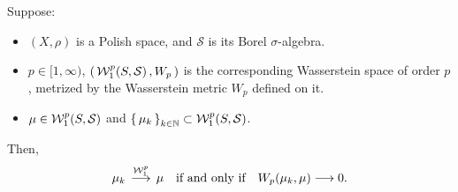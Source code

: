 \begin{theorem}
\noindent
Suppose:
\begin{itemize}
\item $(X, \rho)$ is a Polish space, and $\mathcal{S}$ is its Borel $\sigma$-algebra.
\item $p \in [1,\infty)$,
	$\left(\,\mathcal{W}^{p}_{1}\!\left(S,\mathcal{S}\right),W_{p}\,\right)$ is the corresponding Wasserstein space of order $p$,
	metrized by the Wasserstein metric $W_{p}$ defined on it.
\item $\mu \in \mathcal{W}^{p}_{1}\!\left(S,\mathcal{S}\right)$ and
	$\left\{\,\mu_{k}\,\right\}_{k\in\mathbb{N}} \subset \mathcal{W}^{p}_{1}\!\left(S,\mathcal{S}\right)$.
\end{itemize}
Then,
\begin{equation*}
\mu_{k} \, \overset{\mathcal{W}^{p}_{1}}{\longrightarrow} \, \mu
\quad\textnormal{if and only if}\quad
W_{p}\!\left(\mu_{k},\mu\right) \longrightarrow 0.
\end{equation*}
\end{theorem}

